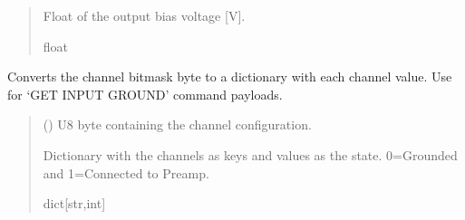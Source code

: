 \documentclass[letterpaper,10pt,english]{sphinxmanual}
\begin{document}
\begin{fulllineitems}
\begin{fulllineitems}
\begin{quote}
\begin{description}
\sphinxAtStartPar
Float of the output bias voltage {[}V{]}.

\sphinxAtStartPar
float

\end{description}\end{quote}

\end{fulllineitems}


\begin{fulllineitems}
\label{\detokenize{Morelia.Devices:Morelia.Devices.PodDevice_8401HR.Pod8401HR.DecodeChannelBitmask}}
\pysigstartsignatures
{}
\pysigstopsignatures
\sphinxAtStartPar
Converts the channel bitmask byte to a dictionary with each channel value.         Use for ‘GET INPUT GROUND’ command payloads.
\begin{quote}\begin{description}
\sphinxAtStartPar
{} () \textendash{} U8 byte containing the channel configuration.

\sphinxAtStartPar
Dictionary with the channels as keys and values as the state.                 0=Grounded and 1=Connected to Preamp.

\sphinxAtStartPar
dict{[}str,int{]}

\end{description}\end{quote}

\end{fulllineitems}



\end{fulllineitems}
\end{document}
